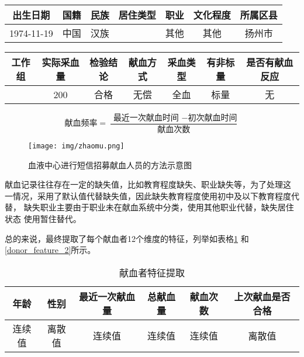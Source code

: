 \documentclass[main.tex]{subfiles}
\begin{document}
\begin{table*}[htbp!]
    \caption{某献血人员的献血记录(续表\ref{donate_record_1})}
    \label{donate_record_2}
    \centering
    \begin{tabular}{ccccccc}
    \hline
    出生日期       & 国籍 & 民族 & 居住类型 & 职业 & 文化程度 & 所属区县 \\ \hline
    1974-11-19 & 中国 & 汉族 &      & 其他 & 其他   & 扬州市  \\ \hline
    \end{tabular}
\end{table*}

\begin{table*}[htbp!]
    \caption{某献血人员的献血记录(续表\ref{donate_record_1})}
    \label{donate_record_3}
    \centering
    \begin{tabular}{ccccccc}
    \hline
    工作组 & 实际采血量 & 检验结论 & 献血方式 & 采血类型 & 有非标量 & 是否有献血反应 \\ \hline
        & 200   & 合格   & 无偿   & 全血   & 标量   & 无       \\ \hline
    \end{tabular}
\end{table*}

\begin{equation}
    \label{donate_freq}
    \text{献血频率} = \frac{\text { 最近一次献血时间 } - \text {初次献血时间}}{\text {献血次数}}
\end{equation}


\begin{figure}[htbp!]
    \centering \texttt{[image: img/zhaomu.png]} 
    \caption{血液中心进行短信招募献血人员的方法示意图}
    \label{text_recruit}
\end{figure}

献血记录往往存在一定的缺失值，比如教育程度缺失、职业缺失等，为了处理这
一情况，采用了默认值代替缺失值，因此缺失教育程度使用初中及以下教育程度代替，
缺失职业主要由于职业未在献血系统中分类，使用其他职业代替，缺失居住状态
使用暂住替代。

总的来说，最终提取了每个献血者12个维度的特征，列举如表格\ref{donor_feature_1}
和\ref{donor_feature_2}所示。
\begin{table}[]
    \caption{献血者特征提取}
    \label{donor_feature_1}
    \centering
    \begin{tabular}{cccccc}
    \hline
    年龄  & 性别  & 最近一次献血量 & 总献血量 & 献血次数 & 上次献血是否合格 \\ \hline
    连续值 & 离散值 & 连续值     & 连续值  & 连续值  & 离散值      \\ \hline
    \end{tabular}
\end{table}
\end{document}
